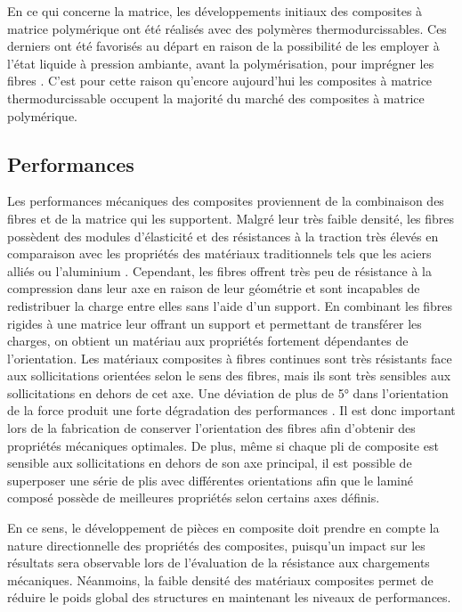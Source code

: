 En ce qui concerne la matrice, les développements initiaux des composites à matrice polymérique ont été réalisés avec des polymères thermodurcissables. 
Ces derniers ont été favorisés au départ en raison de la possibilité de les employer à l'état liquide à pression ambiante, avant la polymérisation, pour imprégner les fibres \cite{Chatain2015}. 
C'est pour cette raison qu'encore aujourd'hui les composites à matrice thermodurcissable occupent la majorité du marché des composites à matrice polymérique. 

\FloatBarrier
\subsection{Performances}

Les performances mécaniques des composites proviennent de la combinaison des fibres et de la matrice qui les supportent. 
Malgré leur très faible densité, les fibres possèdent des modules d'élasticité et des résistances à la traction très élevés en comparaison avec les propriétés des matériaux traditionnels tels que les aciers alliés ou l'aluminium \cite{Hull2001}.
Cependant, les fibres offrent très peu de résistance à la compression dans leur axe en raison de leur géométrie et sont incapables de redistribuer la charge entre elles sans l'aide d'un support. 
En combinant les fibres rigides à une matrice leur offrant un support et permettant de transférer les charges, on obtient un matériau aux propriétés fortement dépendantes de l'orientation. 
Les matériaux composites à fibres continues sont très résistants face aux sollicitations orientées selon le sens des fibres, mais ils sont très sensibles aux sollicitations en dehors de cet axe. 
Une déviation de plus de 5° dans l'orientation de la force produit une forte dégradation des performances \cite{Hull2001}. 
Il est donc important lors de la fabrication de conserver l'orientation des fibres afin d'obtenir des propriétés mécaniques optimales. 
De plus, même si chaque pli de composite est sensible aux sollicitations en dehors de son axe principal, il est possible de superposer une série de plis avec différentes orientations afin que le laminé composé possède de meilleures propriétés selon certains axes définis. 

En ce sens, le développement de pièces en composite doit prendre en compte la nature directionnelle des propriétés des composites, puisqu'un impact sur les résultats sera observable lors de l'évaluation de la résistance aux chargements mécaniques. 
Néanmoins, la faible densité des matériaux composites permet de réduire le poids global des structures en maintenant les niveaux de performances. 

